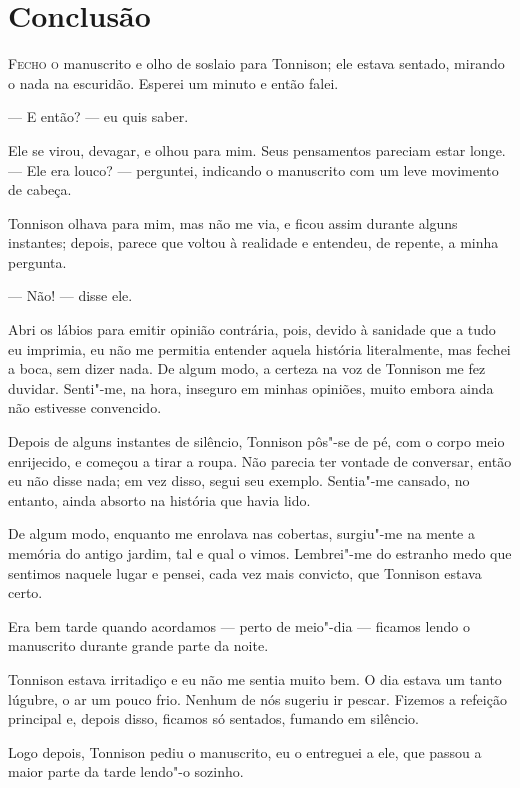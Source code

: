 \clearpage

\chapter{Conclusão}

\textsc{Fecho o} manuscrito e olho de soslaio para Tonnison; ele estava sentado, mirando o nada na escuridão. Esperei um
minuto e então falei.

--- E então? --- eu quis saber.

Ele se virou, devagar, e olhou para mim. Seus pensamentos pareciam estar longe. --- Ele era louco? --- perguntei, indicando o
manuscrito com um leve movimento de cabeça.

Tonnison olhava para mim, mas não me via, e ficou assim durante alguns instantes; depois, parece que voltou à realidade e
entendeu, de repente, a minha pergunta.

--- Não! --- disse ele.

Abri os lábios para emitir opinião contrária, pois, devido à sanidade que a tudo eu imprimia, eu não me permitia
entender aquela história literalmente, mas fechei a boca, sem dizer nada. De algum modo, a certeza na voz de Tonnison
me fez duvidar. Senti"-me, na hora, inseguro em minhas opiniões, muito embora ainda não estivesse convencido.

Depois de alguns instantes de silêncio, Tonnison pôs"-se de pé, com o corpo meio enrijecido, e começou a tirar a roupa.
Não parecia ter vontade de conversar, então eu não disse nada; em vez disso, segui seu exemplo. Sentia"-me cansado, no
entanto, ainda absorto na história que havia lido.

De algum modo, enquanto me enrolava nas cobertas, surgiu"-me na mente a memória do antigo jardim, tal e qual o vimos.
Lembrei"-me do estranho medo que sentimos naquele lugar e pensei, cada vez mais convicto, que Tonnison estava
certo.

Era bem tarde quando acordamos --- perto de meio"-dia --- ficamos lendo o manuscrito durante grande parte da noite.

Tonnison estava irritadiço e eu não me sentia muito bem. O dia estava um tanto lúgubre, o ar um pouco frio. Nenhum de
nós sugeriu ir pescar. Fizemos a refeição principal e, depois disso, ficamos só sentados, fumando em silêncio.

Logo depois, Tonnison pediu o manuscrito, eu o entreguei a ele, que passou a maior parte da tarde lendo"-o sozinho.

